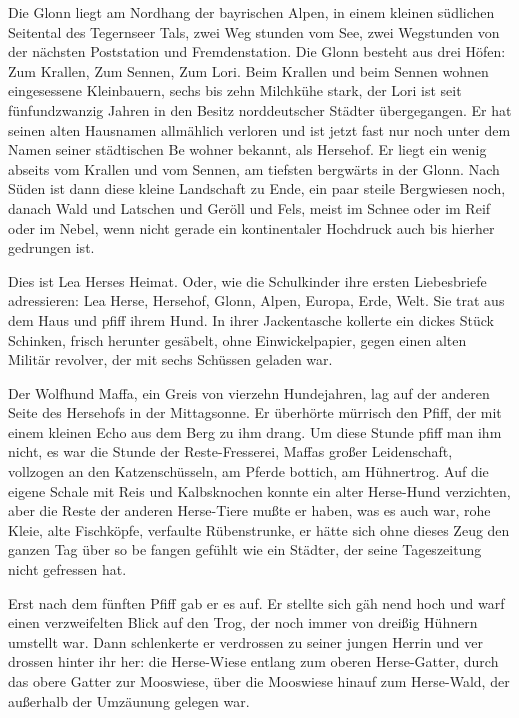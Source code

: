 Die Glonn liegt am Nordhang der bayrischen Alpen, in einem
kleinen südlichen Seitental des Tegernseer Tals, zwei Weg\-%
stunden vom See, zwei Wegstunden von der nächsten Post\-station
und Fremdenstation. Die Glonn besteht aus drei
Höfen: Zum Krallen, Zum Sennen, Zum Lori. Beim Krallen
und beim Sennen wohnen eingesessene Kleinbauern, sechs
bis zehn Milchkühe stark, der Lori ist seit fünfundzwanzig
Jahren in den Besitz norddeutscher Städter übergegangen.
Er hat seinen alten Hausnamen allmählich verloren und ist
jetzt fast nur noch unter dem Namen seiner städtischen Be\-%
wohner bekannt, als Hersehof. Er liegt ein wenig abseits vom
Krallen und vom Sennen, am tiefsten bergwärts in der
Glonn. Nach Süden ist dann diese kleine Landschaft zu Ende,
ein paar steile Bergwiesen noch, danach Wald und Latschen
und Geröll und Fels, meist im Schnee oder im Reif oder im
Nebel, wenn nicht gerade ein kontinentaler Hochdruck auch bis
hierher gedrungen ist.

Dies ist Lea Herses Heimat. Oder, wie die Schulkinder ihre
ersten Liebesbriefe adressieren: Lea Herse, Hersehof, Glonn,
Alpen, Europa, Erde, Welt.
\abstand
Sie trat aus dem Haus und pfiff ihrem Hund. In ihrer
Jackentasche kollerte ein dickes Stück Schinken, frisch herunter\-%
gesäbelt, ohne Einwickelpapier, gegen einen alten Militär\-%
revolver, der mit sechs Schüssen geladen war.

Der Wolfhund Maffa, ein Greis von vierzehn Hundejahren,
lag auf der anderen Seite des Hersehofs in der Mittagsonne.
Er überhörte mürrisch den Pfiff, der mit einem kleinen Echo
aus dem Berg zu ihm drang. Um diese Stunde pfiff man ihm
nicht, es war die Stunde der Reste-Fresserei, Maffas großer
Leidenschaft, vollzogen an den Katzenschüsseln, am Pferde\-%
bottich, am Hühnertrog. Auf die eigene Schale mit Reis und
Kalbsknochen konnte ein alter Herse-Hund verzichten, aber
die Reste der anderen Herse-Tiere mußte er haben, was es
auch war, rohe Kleie, alte Fischköpfe, verfaulte Rübenstrunke,
er hätte sich ohne dieses Zeug den ganzen Tag über so be\-%
fangen gefühlt wie ein Städter, der seine Tageszeitung nicht
gefressen hat.

Erst nach dem fünften Pfiff gab er es auf. Er stellte sich gäh\-%
nend hoch und warf einen verzweifelten Blick auf den Trog,
der noch immer von dreißig Hühnern umstellt war. Dann
schlenkerte er verdrossen zu seiner jungen Herrin und ver\-%
drossen hinter ihr her: die Herse-Wiese entlang zum oberen
Herse-Gatter, durch das obere Gatter zur Mooswiese, über
die Mooswiese hinauf zum Herse-Wald, der außerhalb der
Umzäunung gelegen war.

